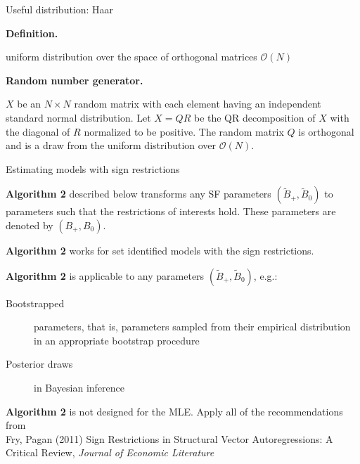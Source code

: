 \documentclass[notes,blackandwhite,mathsans,usenames,dvipsnames]{beamer}
\begin{document}
\begin{frame}{Useful distribution: Haar}

\textbf{Definition.}

 {\color{purple}uniform distribution over the space of orthogonal matrices} $\mathcal{O}(N)$

\bigskip\textbf{Random number generator.}

 $X$ {\color{mcxs2}be an} $N\times N$ {\color{mcxs2}random matrix with each element having an independent standard normal distribution. Let} $X =QR$ {\color{mcxs2}be the QR decomposition of} $X$ {\color{mcxs2}with the diagonal of} $R$ {\color{mcxs2}normalized to be positive. The random matrix $Q$ is orthogonal and is a draw from the uniform distribution over} $\mathcal{O}(N)$.

\end{frame}




\begin{frame}{Estimating models with sign restrictions}

\bigskip\textbf{Algorithm 2} {\color{mcxs2}described below transforms any SF parameters} $(\tilde{B}_+,\tilde{B}_0)$ {\color{mcxs2}to parameters such that the restrictions of interests hold. These parameters are denoted by} $(B_+,B_0)$.

\bigskip\textbf{Algorithm 2} {\color{mcxs2}works for set identified models with the sign restrictions.}

\bigskip\textbf{Algorithm 2} {\color{mcxs2}is applicable to any parameters} $(\tilde{B}_+,\tilde{B}_0)${\color{mcxs2}, e.g.:}
\begin{description}
\item[Bootstrapped] {\color{mcxs2}parameters, that is, parameters sampled from their empirical distribution in an appropriate bootstrap procedure}
\item[Posterior draws] {\color{mcxs2}in Bayesian inference}
\end{description}

\bigskip\textbf{Algorithm 2} {\color{mcxs2}is not designed for the MLE. Apply all of the recommendations from\\ \small Fry, Pagan (2011) Sign Restrictions in Structural Vector Autoregressions: A Critical Review, \emph{Journal of Economic Literature}}
\end{frame}
\end{document}
